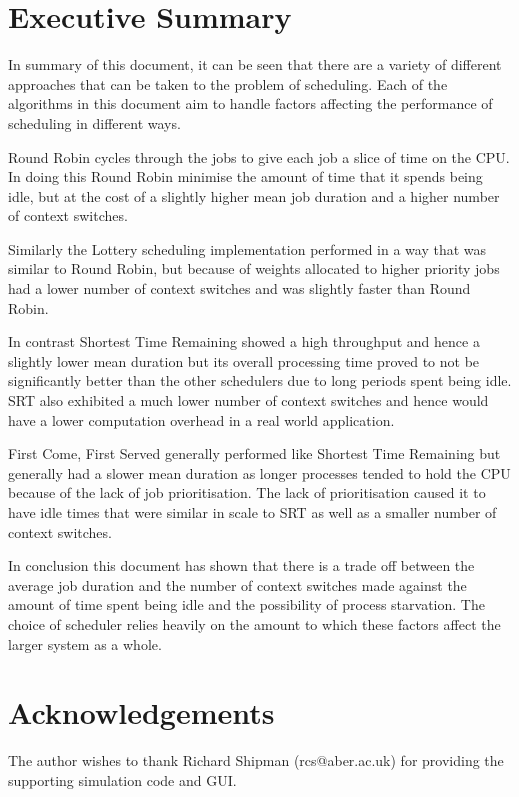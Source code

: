 \documentclass{acm_proc_article-sp}
\begin{document}
\section{Executive Summary}
In summary of this document, it can be seen that there are a variety of different approaches that can be taken to the problem of scheduling. Each of the algorithms in this document aim to handle factors affecting the performance of scheduling in different ways. 

Round Robin cycles through the jobs to give each job a slice of time on the CPU. In doing this Round Robin minimise the amount of time that it spends being idle, but at the cost of a slightly higher mean job duration and a higher number of context switches.

Similarly the Lottery scheduling implementation performed in a way that was similar to Round Robin, but because of weights allocated to higher priority jobs had a lower number of context switches and was slightly faster than Round Robin. 

In contrast Shortest Time Remaining showed a high throughput and hence a slightly lower mean duration but its overall processing time proved to not be significantly better than the other schedulers due to long periods spent being idle. SRT also exhibited a much lower number of context switches and hence would have a lower computation overhead in a real world application.

First Come, First Served generally performed like Shortest Time Remaining but generally had a slower mean duration as longer processes tended to hold the CPU because of the lack of job prioritisation. The lack of prioritisation caused it to have idle times that were similar in scale to SRT as well as a smaller number of context switches.

In conclusion this document has shown that there is a trade off between the average job duration and the number of context switches made against the amount of time spent being idle and the possibility of process starvation. The choice of scheduler relies heavily on the amount to which these factors affect the larger system as a whole.

\section{Acknowledgements}
The author wishes to thank Richard Shipman (rcs@aber.ac.uk) for providing the supporting simulation code and GUI.




\balancecolumns
\end{document}
